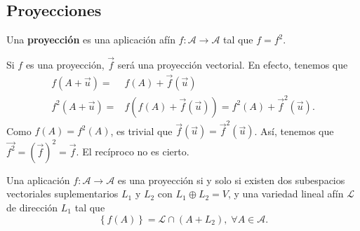 \subsection{Proyecciones}
\begin{fdefinition}[Proyección]
\normalfont Una \textbf{proyección} es una aplicación afín $\displaystyle f : \mathcal{A} \to \mathcal{A} $ tal que $\displaystyle f = f^{2}$.
\end{fdefinition}
\begin{observation}
\normalfont Si $\displaystyle f $ es una proyección, $\displaystyle \vec{f}  $ será una proyección vectorial. En efecto, tenemos que
\[
\begin{split}
	f\left(A + \vec{u}\right) = & f\left(A\right) + \vec{f}\left(\vec{u}\right) \\
	f^{2}\left(A + \vec{u}\right) = & f\left(f\left(A\right) + \vec{f}\left(\vec{u}\right)\right) = f^{2}\left(A\right) + \vec{f}^{2}\left(\vec{u}\right).
\end{split}
\]
Como $\displaystyle f\left(A\right) = f^{2}\left(A\right) $, es trivial que $\displaystyle \vec{f}\left(\vec{u}\right) = \vec{f}^{2}\left(\vec{u}\right) $. Así, tenemos que $\displaystyle \vec{f^{2}} = \left(\vec{f}\right)^{2} = \vec{f} $. El recíproco no es cierto.
\end{observation}
\begin{ftheorem}[]
	\normalfont Una aplicación $\displaystyle f : \mathcal{A} \to \mathcal{A} $ es una proyección si y solo si existen dos subespacios vectoriales suplementarios $\displaystyle L_{1} $ y $\displaystyle L_{2} $ con $\displaystyle L_{1} \oplus L_{2} = V $, y una variedad lineal afín $\displaystyle \mathcal{L} $ de dirección $\displaystyle L_{1} $ tal que 
	\[ \left\{ f\left(A\right)\right\} = \mathcal{L} \cap \left(A+L_{2}\right), \; \forall A \in \mathcal{A} .\]
\end{ftheorem}
